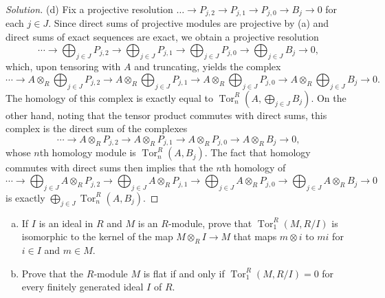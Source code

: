 \documentclass[10pt]{article}
\providecommand{\tensor}{\otimes}
\providecommand{\tor}{\operatorname{Tor}}
\providecommand{\ii}{\item}
\newenvironment{soln}{\begin{proof}[Solution]}{\end{proof}}
\begin{document}
\begin{soln}
    (d) Fix a projective resolution
    $\dots\to P_{j,2}\to P_{j,1}\to P_{j,0}\to B_j\to 0$ for each $j\in J$.
    Since direct sums of projective modules are projective by (a)
    and direct sums of exact sequences are exact, we obtain
    a projective resolution
    \begin{equation*}
	\cdots\to \bigoplus_{j\in J}P_{j,2}\to
	\bigoplus_{j\in J}P_{j,1}\to
	\bigoplus_{j\in J}P_{j,0}\to
	\bigoplus_{j\in J}B_j\to 0,
    \end{equation*}
    which, upon tensoring with $A$ and truncating, yields the complex
    \begin{equation*}
	\cdots\to
	A\tensor_R\bigoplus_{j\in J}P_{j,2}\to
	A\tensor_R\bigoplus_{j\in J}P_{j,1}\to
	A\tensor_R\bigoplus_{j\in J}P_{j,0}\to
	A\tensor_R\bigoplus_{j\in J}B_j\to 0.
    \end{equation*}
    The homology of this complex is exactly equal to
    $\tor_n^R(A,\bigoplus_{j\in J}B_j)$.
    On the other hand, noting that the tensor product commutes
    with direct sums, this complex is the direct sum of the complexes
    \begin{equation*}
	\cdots\to
	A\tensor_RP_{j,2}\to
	A\tensor_RP_{j,1}\to
	A\tensor_RP_{j,0}\to
	A\tensor_RB_j\to 0,
    \end{equation*}
    whose $n$th homology module is $\tor_n^R(A,B_j)$.
    The fact that homology commutes with direct sums then implies that
    the $n$th homology of
    \begin{equation*}
	\cdots\to
	\bigoplus_{j\in J}A\tensor_RP_{j,2}\to
	\bigoplus_{j\in J}A\tensor_RP_{j,1}\to
	\bigoplus_{j\in J}A\tensor_RP_{j,0}\to
	\bigoplus_{j\in J}A\tensor_RB_j\to 0
    \end{equation*}
    is exactly $\bigoplus_{j\in J}\tor_n^R(A,B_j)$.
\end{soln}

\begin{problem}
    [\S17.1\#15]
    \begin{enumerate}[(a)]
        \ii If $I$ is an ideal in $R$ and $M$ is an $R$-module,
	prove that $\tor_1^R(M,R/I)$ is isomorphic
	to the kernel of the map $M\otimes_RI\to M$
	that maps $m\otimes i$ to $mi$ for $i\in I$ and $m\in M$.
	\ii Prove that the $R$-module $M$ is flat
	if and only if $\tor_1^R(M,R/I) = 0$
	for every finitely generated ideal $I$ of $R$.
    \end{enumerate}
\end{problem}
\end{document}
